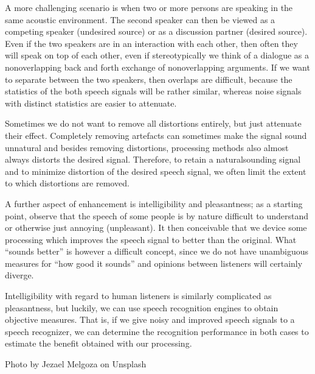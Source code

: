 \documentclass[letterpaper,10pt,english]{jupyterBook}
\begin{document}
\sphinxAtStartPar
A more challenging scenario is when two or more persons are speaking in
the same acoustic environment. The second speaker can then be viewed as
a competing speaker (undesired source) or as a discussion partner
(desired source). Even if the two speakers are in an interaction with
each other, then often they will speak on top of each other, even if
stereotypically we think of a dialogue as a non\sphinxhyphen{}overlapping back and
forth exchange of non\sphinxhyphen{}overlapping arguments. If we want to separate
between the two speakers, then overlaps are difficult, because the
statistics of the both speech signals will be rather similar, whereas
noise signals with distinct statistics are easier to attenuate.

\sphinxAtStartPar
Sometimes we do not want to remove all distortions entirely, but just
attenuate their effect. Completely removing artefacts can sometimes make
the signal sound unnatural and besides removing distortions, processing
methods also almost always distorts the desired signal. Therefore, to
retain a natural\sphinxhyphen{}sounding signal and to minimize distortion of the
desired speech signal, we often limit the extent to which distortions
are removed.

\sphinxAtStartPar
A further aspect of enhancement is intelligibility and pleasantness; as
a starting point, observe that the speech of some people is by nature
difficult to understand or otherwise just annoying (unpleasant). It then
conceivable that we device some processing which improves the speech
signal to better than the original. What “sounds better” is however a
difficult concept, since we do not have unambiguous measures for “how
good it sounds” and opinions between listeners will certainly diverge.

\sphinxAtStartPar
Intelligibility with regard to human listeners is similarly complicated
as pleasantness, but luckily, we can use speech recognition engines to
obtain objective measures. That is, if we give noisy and improved speech
signals to a speech recognizer, we can determine the recognition
performance in both cases to estimate the benefit obtained with our
processing.

\sphinxstepscope

\sphinxAtStartPar
{}
Photo by Jezael Melgoza on Unsplash
\end{document}
